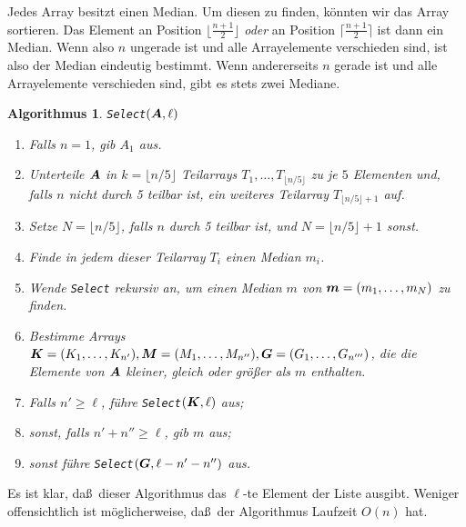\documentclass[10pt,reqno]{amsart}
\numberwithin{equation}{section}
\newcommand\vA{\vec A}
\newcommand\vG{\vec G}
\newcommand\vK{\vec K}
\newcommand\vM{\vec M}
\newcommand\vm{\vec m}
\def\vec#1{\mathchoice{\mbox{\boldmath$\displaystyle#1$}}
{\mbox{\boldmath$\textstyle#1$}}
{\mbox{\boldmath$\scriptstyle#1$}}
{\mbox{\boldmath$\scriptscriptstyle#1$}}}
\newtheorem{algorithm}[definition]{Algorithmus}
\begin{document}
Jedes Array besitzt einen Median.
Um diesen zu finden, k\"onnten wir das Array sortieren. 
Das Element an Position $\lfloor\frac{n+1}2\rfloor$ {\em oder} an Position $\lceil\frac{n+1}2\rceil$ ist dann ein Median.
Wenn also $n$ ungerade ist und alle Arrayelemente verschieden sind, ist also der Median eindeutig bestimmt.
Wenn andererseits $n$ gerade ist und alle Arrayelemente verschieden sind, gibt es stets zwei Mediane.

\begin{algorithm}
	{\tt Select}$(\vA,\ell)$
	\begin{enumerate}
		\item Falls $n=1$, gib $A_1$ aus.
		\item Unterteile $\vA$ in $k=\lfloor n/5\rfloor$ Teilarrays $T_1,\ldots,T_{\lfloor n/5\rfloor}$ zu je $5$ Elementen und, falls $n$ nicht durch 5 teilbar ist, ein weiteres Teilarray $T_{\lfloor n/5\rfloor+1}$ auf.
		\item Setze $N=\lfloor n/5\rfloor$, falls $n$ durch 5 teilbar ist, und $N=\lfloor n/5\rfloor+1$ sonst.
		\item Finde in jedem dieser Teilarray $T_i$ einen Median $m_i$.
		\item Wende {\tt Select} rekursiv an, um einen Median $m$ von $\vm=(m_1,\ldots,m_N)$ zu finden.
		\item Bestimme Arrays $\vK=(K_1,\ldots,K_{n'}),\vM=(M_1,\ldots,M_{n''}),\vG=(G_1,\ldots,G_{n'''})$, die die Elemente von $\vA$ kleiner, gleich oder gr\"o\ss er als $m$ enthalten.
		\item Falls $n'\geq\ell$, f\"uhre {\tt Select}$(\vK,\ell)$ aus;
		\item sonst, falls $n'+n''\geq\ell$, gib $m$ aus;
		\item sonst f\"uhre {\tt Select}$(\vG,\ell-n'-n'')$ aus.
	\end{enumerate}
\end{algorithm}

Es ist klar, da\ss\ dieser Algorithmus das $\ell$-te Element der Liste ausgibt.
Weniger offensichtlich ist m\"oglicherweise, da\ss\ der Algorithmus Laufzeit $O(n)$ hat.
\end{document}

